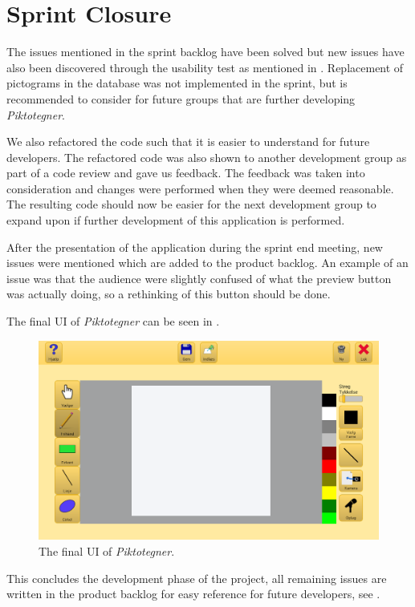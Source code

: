 \section{Sprint Closure}
The issues mentioned in the sprint backlog have been solved but new issues have also been discovered through the usability test as mentioned in .
Replacement of pictograms in the database was not implemented in the sprint, but is recommended to consider for future groups that are further developing \textit{Piktotegner}.

We also refactored the code such that it is easier to understand for future developers.
The refactored code was also shown to another development group as part of a code review and gave us feedback.
The feedback was taken into consideration and changes were performed when they were deemed reasonable.
The resulting code should now be easier for the next development group to expand upon if further development of this application is performed.

After the presentation of the application during the sprint end meeting, new issues were mentioned which are added to the product backlog.
An example of an issue was that the audience were slightly confused of what the preview button was actually doing, so a rethinking of this button should be done.

The final UI of \textit{Piktotegner} can be seen in .

\begin{figure}[h]
	\centering
	\includegraphics[width=\textwidth]{media/sprint4/final-main-ui}
	\caption{The final UI of \textit{Piktotegner}.}
	\label{fig:main_ui}
\end{figure}


This concludes the development phase of the project, all remaining issues are written in the product backlog for easy reference for future developers, see .